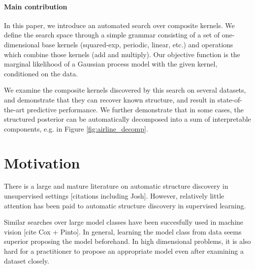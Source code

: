 \documentclass[twoside]{article}
\begin{document}
\paragraph{Main contribution}
In this paper, we introduce an automated search over composite kernels.
We define the search space through a simple grammar consisting of a set of one-dimensional base kernels (squared-exp, periodic, linear, etc.) and operations which combine those kernels (add and multiply).
Our objective function is the marginal likelihood of a Gaussian process model with the given kernel, conditioned on the data.

We examine the composite kernels discovered by this search on several datasets, and demonstrate that they can recover known structure, and result in state-of-the-art predictive performance.  We further demonstrate that in some cases, the structured posterior can be automatically decomposed into a sum of interpretable components, e.g. in Figure \ref{fig:airline_decomp}.

\section{Motivation}
There is a large and mature literature on automatic structure discovery in unsupervised settings [citations including Josh].
However, relatively little attention has been paid to automatic structure discovery in supervised learning.

Similar searches over large model classes have been succesfully used in machine vision [cite Cox + Pinto].
In general, learning the model class from data seems superior proposing the model beforehand.
In high dimensional problems, it is also hard for a practitioner to propose an appropriate model even after examining a dataset closely.


\end{document}
